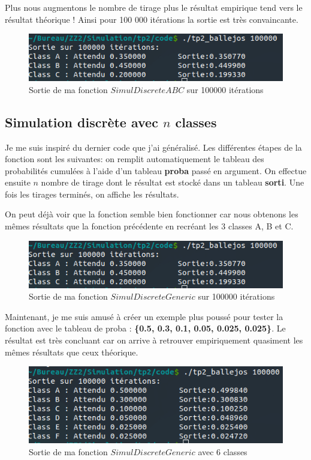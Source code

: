 \documentclass[12pt,french]{article} %
\begin{document}
Plus nous augmentons le nombre de tirage plus le résultat empirique tend vers le résultat théorique ! Ainsi pour 100 000 itérations la sortie est très convaincante.

\begin{figure}[H]
	\centering
	\includegraphics[scale=0.8]{exo3-2.png}
	\caption{Sortie de ma fonction $SimulDiscreteABC$ sur 100000 itérations}    
\end{figure}

\subsection{Simulation discrète avec $n$ classes}

Je me suis inspiré du dernier code que j'ai généralisé. Les différentes étapes de la fonction sont les suivantes: on remplit automatiquement le tableau des probabilités cumulées à l'aide d'un tableau \textbf{proba} passé en argument. On effectue ensuite $n$ nombre de tirage dont le résultat est stocké dans un tableau \textbf{sorti}. Une fois les tirages terminés, on affiche les résultats.

On peut déjà voir que la fonction semble bien fonctionner car nous obtenons les mêmes résultats que la fonction précédente en recréant les 3 classes A, B et C.

\begin{figure}[H]
	\centering
	\includegraphics[scale=0.8]{exo3-2.png}
	\caption{Sortie de ma fonction $SimulDiscreteGeneric$ sur 100000 itérations}    
\end{figure}

Maintenant, je me suis amusé à créer un exemple plus poussé pour tester la fonction avec le tableau de proba : \textbf{\{0.5, 0.3, 0.1, 0.05, 0.025, 0.025\}}. Le résultat est très concluant car on arrive à retrouver empiriquement quasiment les mêmes résultats que ceux théorique.

\begin{figure}[H]
	\centering
	\includegraphics[scale=0.8]{exo3-3.png}
	\caption{Sortie de ma fonction $SimulDiscreteGeneric$ avec 6 classes}    
\end{figure}
\end{document}
